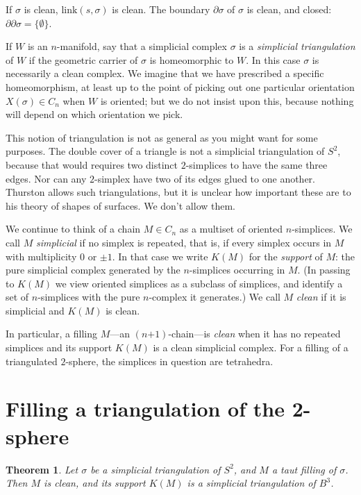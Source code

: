 \documentclass[12pt]{article}
\newtheorem{theorem}{Theorem}
\def\del{\partial}
\newcommand{\kw}{\mathrm}
\newcommand{\link}{\kw{link}}
\newcommand{\pls}{\mathord{+}}
\begin{document}
If $\sigma$ is clean, 
$\link(s,\sigma)$ is clean.
The boundary $\del \sigma$ of $\sigma$ is clean,
and closed:
$\del \del \sigma = \{\emptyset\}$.

If $W$ is an $n$-manifold,
say that a simplicial complex $\sigma$
is a \emph{simplicial triangulation} of $W$
if the geometric carrier of $\sigma$ is homeomorphic to $W$.
In this case $\sigma$ is necessarily a clean complex.
We imagine that we have prescribed a specific homeomorphism,
at least up to the point of picking out one particular orientation
$X(\sigma) \in C_n$ when $W$ is oriented;
but we do not insist upon this, because nothing will depend on which
orientation we pick.

This notion of triangulation is not as general as you might want
for some purposes.
The double cover of a triangle is not a simplicial triangulation
of $S^2$,
because that would requires two distinct
$2$-simplices to have the same three edges.
Nor can any $2$-simplex have two of its edges
glued to one another.
Thurston
\cite{thurston:shapes}
allows such triangulations,
but it is unclear how important these are to
his theory of shapes of surfaces.
We don't allow them.

We continue to think of a chain $M \in C_n$ as a multiset of
oriented $n$-simplices.
We call $M$ \emph{simplicial} if no simplex is repeated, that is, if every
simplex occurs in $M$ with multiplicity $0$ or $\pm 1$.
In that case we write $K(M)$ for the \emph{support} of $M$: the pure
simplicial complex generated by the $n$-simplices occurring in $M$.
(In passing to $K(M)$ we view oriented simplices as a subclass of
simplices, and identify a set of $n$-simplices with the pure $n$-complex
it generates.)
We call $M$ \emph{clean} if it is simplicial and $K(M)$ is clean.

In particular, a filling $M$---an $(n\pls1)$-chain---is \emph{clean} when
it has no repeated simplices and its support $K(M)$ is a clean simplicial
complex. For a filling of a triangulated $2$-sphere, the simplices in
question are tetrahedra.

\section{Filling a triangulation of the 2-sphere}

\begin{theorem} \label{th2}
Let $\sigma$ be a simplicial triangulation of $S^2$,
and $M$ a taut filling of $\sigma$.
Then $M$ is clean, and its support $K(M)$
is a simplicial triangulation of $B^3$.
\end{theorem}
\end{document}
